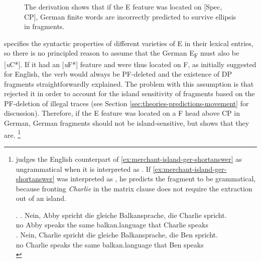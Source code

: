 \begin{figure}

\caption{The derivation shows that if the E feature was located on [Spec, CP], German finite words are incorrectly predicted to survive ellipsis in fragments.\label{fig:merchant-spec-cp}}
\end{figure}
%
\citet{merchant2004} specifies the syntactic properties of different varieties of E in their lexical entries, so there is no principled reason to assume that the German E\textsubscript{F} must also be [\textit{u}C*]. If it had an [\textit{u}F*] feature and were thus located on F, as \citet{merchant2004} initially suggested for English, the verb would always be PF-deleted and the existence of DP fragments straightforwardly explained. The problem with this assumption is that \citet{merchant2004} rejected it in order to account for the island sensitivity of fragments based on the PF-deletion of illegal traces (see Section \ref{sec:theories-predictions-movement} for discussion). Therefore, if the E feature was located on a F head above CP in German, German fragments should not be island-sensitive, but \Next shows that they are.%
%
{\footnote{\citet{merchant2004} judges the English counterpart of \ref{ex:merchant-island-ger-shortanswer} as ungrammatical when it is interpreted as \Next[a]. If \ref{ex:merchant-island-ger-shortanswer} was interpreted as \Next[b], he predicts the fragment to be grammatical, because fronting \textit{Charlie} in the matrix clause does not require the extraction out of an island.

\ex. \ag. Nein, Abby spricht die gleiche Balkansprache, die Charlie spricht.\\
	 no Abby speaks the same balkan.language that Charlie speaks\\
     \bg. Nein, Charlie spricht die gleiche Balkansprache, die Ben spricht.\\
     	 no Charlie speaks the same balkan.language that Ben speaks\\
       
}}
\afterfn%
%

